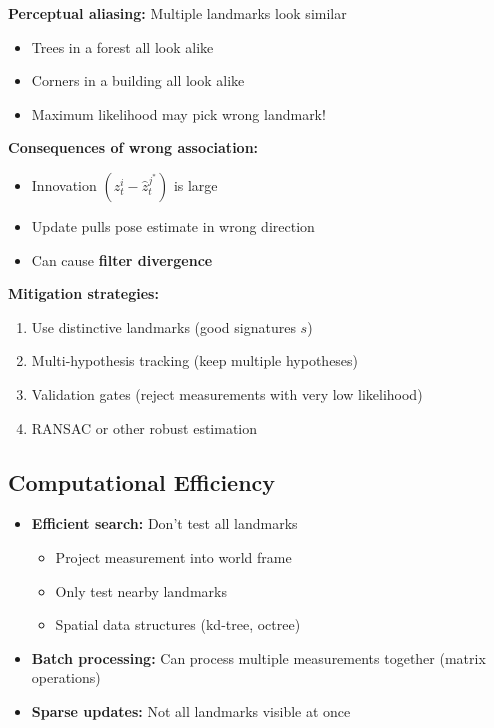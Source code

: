 \begin{tcolorbox}[colback=red!5!white,colframe=red!75!black,title=When Data Association Fails]

\textbf{Perceptual aliasing:} Multiple landmarks look similar
\begin{itemize}
    \item Trees in a forest all look alike
    \item Corners in a building all look alike
    \item Maximum likelihood may pick wrong landmark!
\end{itemize}

\textbf{Consequences of wrong association:}
\begin{itemize}
    \item Innovation $(z_t^i - \hat{z}_t^{j^*})$ is large
    \item Update pulls pose estimate in wrong direction
    \item Can cause \textbf{filter divergence}
\end{itemize}

\textbf{Mitigation strategies:}
\begin{enumerate}
    \item Use distinctive landmarks (good signatures $s$)
    \item Multi-hypothesis tracking (keep multiple hypotheses)
    \item Validation gates (reject measurements with very low likelihood)
    \item RANSAC or other robust estimation
\end{enumerate}

\end{tcolorbox}

\subsection{Computational Efficiency}

\begin{itemize}
    \item \textbf{Efficient search:} Don't test all landmarks
    \begin{itemize}
        \item Project measurement into world frame
        \item Only test nearby landmarks
        \item Spatial data structures (kd-tree, octree)
    \end{itemize}
    
    \item \textbf{Batch processing:} Can process multiple measurements together (matrix operations)
    
    \item \textbf{Sparse updates:} Not all landmarks visible at once
\end{itemize}

